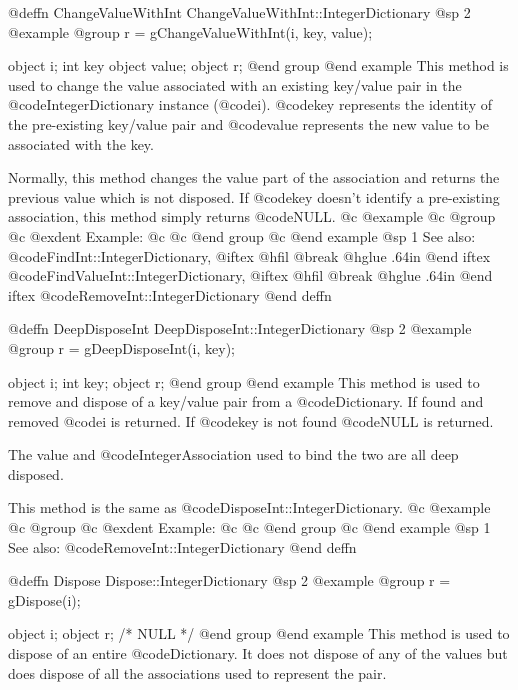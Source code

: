 @deffn {ChangeValueWithInt} ChangeValueWithInt::IntegerDictionary
@sp 2
@example
@group
r = gChangeValueWithInt(i, key, value);

object  i;
int     key
object  value;
object  r;
@end group
@end example
This method is used to change the value associated with an existing
key/value pair in the @code{IntegerDictionary} instance (@code{i}).
@code{key} represents the identity of the pre-existing key/value
pair and @code{value} represents the new value to be associated with
the key.

Normally, this method changes the value part of the association
and returns the previous value which is not disposed.  If
@code{key} doesn't identify a pre-existing association, this method
simply returns @code{NULL}.
@c @example
@c @group
@c @exdent Example:
@c 
@c @end group
@c @end example
@sp 1
See also:  @code{FindInt::IntegerDictionary,}
@iftex
@hfil @break @hglue .64in      
@end iftex
@code{FindValueInt::IntegerDictionary,}
@iftex
@hfil @break @hglue .64in      
@end iftex
@code{RemoveInt::IntegerDictionary}
@end deffn











@deffn {DeepDisposeInt} DeepDisposeInt::IntegerDictionary
@sp 2
@example
@group
r = gDeepDisposeInt(i, key);

object  i;
int     key;
object  r;
@end group
@end example
This method is used to remove and dispose of a key/value pair from a
@code{Dictionary}.  If found and removed @code{i} is returned.  If @code{key}
is not found @code{NULL} is returned.

The value and @code{IntegerAssociation} used to bind the two are all deep
disposed.

This method is the same as @code{DisposeInt::IntegerDictionary}.
@c @example
@c @group
@c @exdent Example:
@c 
@c @end group
@c @end example
@sp 1
See also:  @code{RemoveInt::IntegerDictionary}
@end deffn













@deffn {Dispose} Dispose::IntegerDictionary
@sp 2
@example
@group
r = gDispose(i);

object  i;
object  r;     /*  NULL  */
@end group
@end example
This method is used to dispose of an entire @code{Dictionary}.  It does not
dispose of any of the values but does dispose of all the associations
used to represent the pair.  

